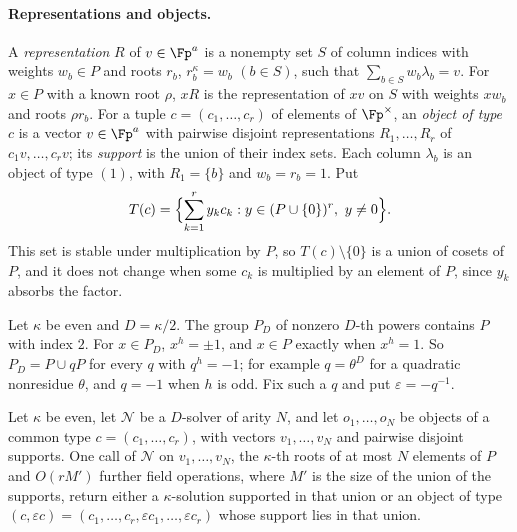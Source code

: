 \paragraph{Representations and objects.} A \emph{representation} $R$ of $v \in \Fp^a$ is a nonempty set $S$ of column indices with weights $w_b \in P$ and roots $r_b$, $r_b^\kappa = w_b$ $(b \in S)$, such that $\sum_{b\in S}w_b\lambda_b = v$. For $x \in P$ with a known root $\rho$, $xR$ is the representation of $xv$ on $S$ with weights $xw_b$ and roots $\rho r_b$. For a tuple $c = (c_1,\dots,c_r)$ of elements of $\Fp^\times$, an \emph{object of type $c$} is a vector $v \in \Fp^a$ with pairwise disjoint representations $R_1,\dots,R_r$ of $c_1v,\dots,c_rv$; its \emph{support} is the union of their index sets. Each column $\lambda_b$ is an object of type $(1)$, with $R_1 = \{b\}$ and $w_b = r_b = 1$. Put
\[
  T(c) = \Bigl\{\sum_{k=1}^r y_kc_k : y \in (P\cup\{0\})^r,\ y \ne 0\Bigr\}.
\]
This set is stable under multiplication by $P$, so $T(c) \setminus \{0\}$ is a union of cosets of $P$, and it does not change when some $c_k$ is multiplied by an element of $P$, since $y_k$ absorbs the factor.

Let $\kappa$ be even and $D = \kappa/2$. The group $P_D$ of nonzero $D$-th powers contains $P$ with index $2$. For $x \in P_D$, $x^h = \pm 1$, and $x \in P$ exactly when $x^h = 1$. So $P_D = P \cup qP$ for every $q$ with $q^h = -1$; for example $q = \theta^D$ for a quadratic nonresidue $\theta$, and $q = -1$ when $h$ is odd. Fix such a $q$ and put $\varepsilon = -q^{-1}$.

\begin{lemma}[Stage]
\label{lem:stage}
Let $\kappa$ be even, let $\mathcal N$ be a $D$-solver of arity $N$, and let $o_1,\dots,o_N$ be objects of a common type $c = (c_1,\dots,c_r)$, with vectors $v_1,\dots,v_N$ and pairwise disjoint supports. One call of $\mathcal N$ on $v_1,\dots,v_N$, the $\kappa$-th roots of at most $N$ elements of $P$ and $O(rM')$ further field operations, where $M'$ is the size of the union of the supports, return either a $\kappa$-solution supported in that union or an object of type $(c,\varepsilon c) = (c_1,\dots,c_r,\varepsilon c_1,\dots,\varepsilon c_r)$ whose support lies in that union.
\end{lemma}

